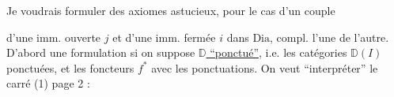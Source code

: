 
Je voudrais formuler des axiomes astucieux, pour le cas d'un couple


d'une imm. ouverte $j$ et d'une imm. fermée $i$ dans $\mathrm{Dia}$, compl. l'une de l'autre. D'abord une formulation si on suppose \uline{$\mathbb D$ ``ponctué''}, i.e. les catégories $\mathbb D(I)$ ponctuées, et les foncteurs $f^{*}$  avec les ponctuations. On veut ``interpréter'' le carré (1) page 2 :

